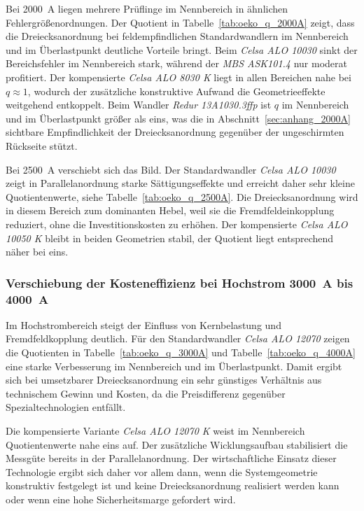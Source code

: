 Bei \SI{2000}{A} liegen mehrere Prüflinge im Nennbereich in ähnlichen Fehlergrößenordnungen. Der Quotient in Tabelle~\ref{tab:oeko_q_2000A} zeigt, dass die Dreiecksanordnung bei feldempfindlichen Standardwandlern im Nennbereich und im Überlastpunkt deutliche Vorteile bringt. Beim \textit{Celsa ALO 10030} sinkt der Bereichsfehler im Nennbereich stark, während der \textit{MBS ASK101.4} nur moderat profitiert. Der kompensierte \textit{Celsa ALO 8030 K} liegt in allen Bereichen nahe bei \(q\approx 1\), wodurch der zusätzliche konstruktive Aufwand die Geometrieeffekte weitgehend entkoppelt. Beim  Wandler \textit{Redur 13A1030.3ffp} ist \(q\) im Nennbereich und im Überlastpunkt größer als eins, was die in Abschnitt~\ref{sec:anhang_2000A} sichtbare Empfindlichkeit der Dreiecksanordnung gegenüber der ungeschirmten Rückseite stützt.

Bei \SI{2500}{A} verschiebt sich das Bild. Der Standardwandler \textit{Celsa ALO 10030} zeigt in Parallelanordnung starke Sättigungseffekte und erreicht daher sehr kleine Quotientenwerte, siehe Tabelle~\ref{tab:oeko_q_2500A}. Die Dreiecksanordnung wird in diesem Bereich zum dominanten Hebel, weil sie die Fremdfeldeinkopplung reduziert, ohne die Investitionskosten zu erhöhen. Der kompensierte \textit{Celsa ALO 10050 K} bleibt in beiden Geometrien stabil, der Quotient liegt entsprechend näher bei eins.

\subsubsection{Verschiebung der Kosteneffizienz bei Hochstrom \SI{3000}{A} bis \SI{4000}{A}}

Im Hochstrombereich steigt der Einfluss von Kernbelastung und Fremdfeldkopplung deutlich. Für den Standardwandler \textit{Celsa ALO 12070} zeigen die Quotienten in Tabelle~\ref{tab:oeko_q_3000A} und Tabelle~\ref{tab:oeko_q_4000A} eine starke Verbesserung im Nennbereich und im Überlastpunkt. Damit ergibt sich bei umsetzbarer Dreiecksanordnung ein sehr günstiges Verhältnis aus technischem Gewinn und Kosten, da die Preisdifferenz gegenüber Spezialtechnologien entfällt. 

Die kompensierte Variante \textit{Celsa ALO 12070 K} weist im Nennbereich Quotientenwerte nahe eins auf. Der zusätzliche Wicklungsaufbau stabilisiert die Messgüte bereits in der Parallelanordnung. Der wirtschaftliche Einsatz dieser Technologie ergibt sich daher vor allem dann, wenn die Systemgeometrie konstruktiv festgelegt ist und keine Dreiecksanordnung realisiert werden kann oder wenn eine hohe Sicherheitsmarge gefordert wird.

